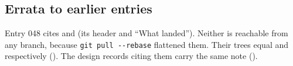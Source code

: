 \subsection*{Errata to earlier entries}
Entry 048 cites  and  (its header and ``What
landed''). Neither is reachable from any branch, because \texttt{git pull -{}-rebase}
flattened them. Their trees equal  and 
respectively (). The design records citing
them carry the same note ().
